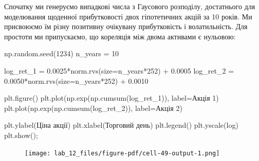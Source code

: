 \documentclass[
  letterpaper,
]{report}
\newenvironment{Shaded}{\begin{snugshade}}{\end{snugshade}}
\newcommand{\DecValTok}[1]{\textcolor[rgb]{0.68,0.00,0.00}{#1}}
\newcommand{\FloatTok}[1]{\textcolor[rgb]{0.68,0.00,0.00}{#1}}
\newcommand{\NormalTok}[1]{\textcolor[rgb]{0.00,0.23,0.31}{#1}}
\newcommand{\OperatorTok}[1]{\textcolor[rgb]{0.37,0.37,0.37}{#1}}
\newcommand{\StringTok}[1]{\textcolor[rgb]{0.13,0.47,0.30}{#1}}
\begin{document}
Спочатку ми генеруємо випадкові числа з Гаусового розподілу, достатнього
для моделювання щоденної прибутковості двох гіпотетичних акцій за 10
років. Ми присвоюємо їм різну позитивну очікувану прибутковість і
волатильність. Для простоти ми припускаємо, що кореляція між двома
активами є нульовою:

\begin{Shaded}
\begin{Highlighting}[]
\NormalTok{np.random.seed(}\DecValTok{1234}\NormalTok{)}
\NormalTok{n\_years }\OperatorTok{=} \DecValTok{10}

\NormalTok{log\_ret\_1 }\OperatorTok{=} \FloatTok{0.0025}\OperatorTok{*}\NormalTok{norm.rvs(size}\OperatorTok{=}\NormalTok{n\_years}\OperatorTok{*}\DecValTok{252}\NormalTok{) }\OperatorTok{+} \FloatTok{0.0005}
\NormalTok{log\_ret\_2 }\OperatorTok{=} \FloatTok{0.0050}\OperatorTok{*}\NormalTok{norm.rvs(size}\OperatorTok{=}\NormalTok{n\_years}\OperatorTok{*}\DecValTok{252}\NormalTok{) }\OperatorTok{+} \FloatTok{0.0010}

\NormalTok{plt.figure()}
\NormalTok{plt.plot(np.exp(np.cumsum(log\_ret\_1)), label}\OperatorTok{=}\StringTok{\textquotesingle{}Акція 1\textquotesingle{}}\NormalTok{)}
\NormalTok{plt.plot(np.exp(np.cumsum(log\_ret\_2)), label}\OperatorTok{=}\StringTok{\textquotesingle{}Акція 2\textquotesingle{}}\NormalTok{)}

\NormalTok{plt.ylabel(}\StringTok{\textquotesingle{}Ціна акції\textquotesingle{}}\NormalTok{)}
\NormalTok{plt.xlabel(}\StringTok{\textquotesingle{}Торговий день\textquotesingle{}}\NormalTok{)}
\NormalTok{plt.legend()}
\NormalTok{plt.yscale(}\StringTok{\textquotesingle{}log\textquotesingle{}}\NormalTok{)}
\NormalTok{plt.show()}\OperatorTok{;}
\end{Highlighting}
\end{Shaded}

\begin{figure}[H]

{\centering \texttt{[image: lab\_12\_files/figure-pdf/cell-49-output-1.png]}

}

\end{figure}
\end{document}
